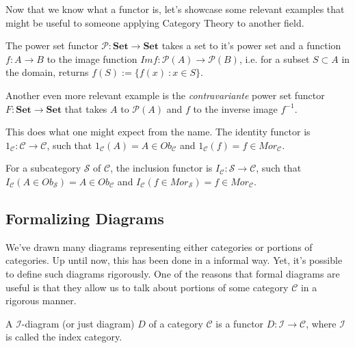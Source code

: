 Now that we know what a functor is, let's showcase some relevant examples
that might be useful to someone applying Category Theory to another field.

\begin{example}
	The power set functor $\mathcal P : \mathbf{Set} \to \mathbf{Set}$ takes a
	set to it's power set and a function $f:A\to B$ to the image function
	$Im f : \mathcal P(A) \to \mathcal P(B)$, i.e. for a subset $S \subset A$
	in the domain, returns $f(S) := \{ f(x) \ : x \in S\}$.

	Another even more relevant example is the \textit{contravariante} power set
	functor $F : \mathbf{Set} \to \mathbf{Set}$ that takes $A$ to $\mathcal P(A)$
	and $f$ to the inverse image $f^{-1}$.
\end{example}

\begin{example}
	This does what one might expect from the name. The identity
	functor is $1_\mathcal C : \mathcal C \to \mathcal C$, such that
	$1_\mathcal C (A) = A \in Ob_\mathcal C$ and
	$1_\mathcal C (f) = f \in Mor_\mathcal C$.
\end{example}

\begin{example}
	For a subcategory $\mathcal S$ of $\mathcal C$, the inclusion
	functor is $I_\mathcal C : \mathcal S \to \mathcal C$, such that
	$I_\mathcal C (A \in Ob_\mathcal S) = A \in Ob_\mathcal C$ and
	$I_\mathcal C (f \in Mor_\mathcal S) = f \in Mor_\mathcal C$.
\end{example}

\subsection{Formalizing Diagrams}

We've drawn many diagrams representing either categories or portions of categories. Up
until now, this has been done in a informal way. Yet, it's possible to define such diagrams rigorously.
One of the reasons that formal diagrams are useful is that they allow us to talk about portions
of some category $\mathcal C$ in a rigorous manner.

\begin{definition}[Diagram]
	A $\mathcal I$-diagram (or just diagram) $D$ of a category $\mathcal C$ is a functor
	$D: \mathcal I \to \mathcal C$, where $\mathcal I$ is called the index category.
\end{definition}

